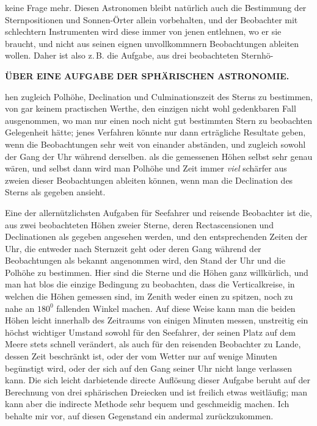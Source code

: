 keine Frage mehr. Diesen Astronomen bleibt natürlich auch die Bestimmung
der Sternpositionen und Sonnen-Örter allein vorbehalten, und der Beobachter
mit schlechtern Instrumenten wird diese immer von jenen entlehnen, wo
er sie braucht, und nicht aus seinen eignen unvollkommnern Beobachtungen ableiten
wollen. Daher ist also z.\,B. die Aufgabe, aus drei beobachteten Sternhö-\par
{}
\par\clearpage
\thispagestyle{empty}
\noindent{}%
%
\parbox[t]{\dimexpr\linewidth-24mm\relax}{\centering\fontsize{8.5}{10}\selectfont\bfseries ÜBER EINE AUFGABE DER SPHÄRISCHEN ASTRONOMIE.\par}%
\makebox[12mm][r]{}\par\nobreak\medskip
\noindent hen zugleich Polhöhe, Declination und Culminationszeit des Sterns zu bestimmen,
von gar keinem practischen Werthe, den einzigen nicht wohl gedenkbaren
Fall ausgenommen, wo man nur einen noch nicht gut bestimmten Stern zu beobachten
Gelegenheit hätte; jenes Verfahren könnte nur dann erträgliche Resultate
geben, wenn die Beobachtungen sehr weit von einander abständen, und zugleich
sowohl der Gang der Uhr während derselben. als die gemessenen Höhen selbst
sehr genau wären, und selbst dann wird man Polhöhe und Zeit immer \textit{viel} schärfer
aus zweien dieser Beobachtungen ableiten können, wenn man die Declination
des Sterns als gegeben ansieht.

Eine der allernützlichsten Aufgaben für Seefahrer und reisende Beobachter
ist die, aus zwei beobachteten Höhen zweier Sterne, deren Rectascensionen und
Declinationen als gegeben angesehen werden, und den entsprechenden Zeiten der
Uhr, die entweder nach Sternzeit geht oder deren Gang während der Beobachtungen
als bekannt angenommen wird, den Stand der Uhr und die Polhöhe zu
bestimmen. Hier sind die Sterne und die Höhen ganz willkürlich, und man
hat blos die einzige Bedingung zu beobachten, dass die Verticalkreise, in welchen
die Höhen gemessen sind, im Zenith weder einen zu spitzen, noch zu nahe
an $180^0$ fallenden Winkel machen. Auf diese Weise kann man die beiden Höhen
leicht innerhalb des Zeitraums von einigen Minuten messen, unstreitig ein
höchst wichtiger Umstand sowohl für den Seefahrer, der seinen Platz auf dem
Meere stets schnell verändert, als auch für den reisenden Beobachter zu Lande,
dessen Zeit beschränkt ist, oder der vom Wetter nur auf wenige Minuten begünstigt
wird, oder der sich auf den Gang seiner Uhr nicht lange verlassen kann.
Die sich leicht darbietende directe Auflösung dieser Aufgabe beruht auf der Berechnung
von drei sphärischen Dreiecken und ist freilich etwas weitläufig; man
kann aber die indirecte Methode sehr bequem und geschmeidig machen. Ich behalte
mir vor, auf diesen Gegenstand ein andermal zurückzukommen.

